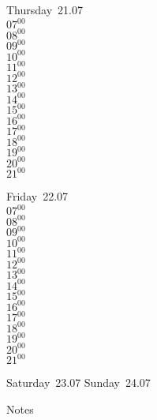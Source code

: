 \documentclass[11pt,a4paper]{book}\usepackage[]{graphicx}\usepackage[]{color}
\begin{document}
\clearpage
\begin{headerbox}
\end{headerbox}
\begin{weekdaybox}
  Thursday~21.07\\
  { 
  \vfill
  $07^{00}$\\
$08^{00}$\\
$09^{00}$\\
$10^{00}$\\
$11^{00}$\\
$12^{00}$\\
$13^{00}$\\
$14^{00}$\\
$15^{00}$\\
$16^{00}$\\
$17^{00}$\\
$18^{00}$\\
$19^{00}$\\
$20^{00}$\\
$21^{00}$\\
  }
\end{weekdaybox} 
\begin{weekdaybox}
  Friday~22.07\\
  { 
  \vfill
  $07^{00}$\\
$08^{00}$\\
$09^{00}$\\
$10^{00}$\\
$11^{00}$\\
$12^{00}$\\
$13^{00}$\\
$14^{00}$\\
$15^{00}$\\
$16^{00}$\\
$17^{00}$\\
$18^{00}$\\
$19^{00}$\\
$20^{00}$\\
$21^{00}$\\
  }
\end{weekdaybox}
\begin{weekendbox}
  Saturday~23.07
  \tcblower
  Sunday~24.07
\end{weekendbox} %
\begin{notebox}
  Notes
\end{notebox}
\clearpage
\end{document}
